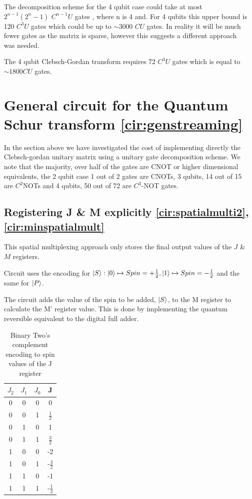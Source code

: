 \documentclass[12pt]{article}
\begin{document}
The decomposition scheme for the 4 qubit case could take at most $2^{n-1}(2^n-1)$ $C^{n-1}U$ gates \cite{li2013decomposition}, where n is 4 and. For 4 qubits this upper bound is 120 $C^3U$ gates which could be up to $\sim 3000$ $CU$ gates. In reality it will be much fewer gates as the matrix is sparse, however this suggests a different approach was needed.

The 4 qubit Clebsch-Gordan transform requires 72 $C^3U$ gates which is equal to $\sim 1800 CU$ gates. 

\section{General circuit for the Quantum Schur transform \autoref{cir:genstreaming}}

In the section above we have investigated the cost of implementing directly the Clebsch-gordan unitary matrix using a unitary gate decomposition scheme. We note that the majority, over half of the gates are CNOT or higher dimensional equivalents, the 2 qubit case 1 out of 2 gates are CNOTs, 3 qubits, 14 out of 15 are $C^2$NOTs and 4 qubits, 50 out of 72 are $C^3$-NOT gates. 


\subsection{Registering J \& M explicitly \autoref{cir:spatialmulti2}, \autoref{cir:minspatialmult}}

This spatial multiplexing approach only stores the final output values of the $J$ \& $M$ registers. 


Circuit uses the encoding for $\left\vert{S}\right\rangle : \left\vert{0}\right\rangle \mapsto Spin = +\frac{1}{2}, \left\vert{1}\right\rangle \mapsto Spin = -\frac{1}{2}$ and the same for $\left\vert{P}\right\rangle$. 

The circuit adds the value of the spin to be added, $\left\vert{S}\right\rangle$, to the M register to calculate the M' register value. This is done by implementing the quantum reversible equivalent to the digital full adder. 

\begin{table}
\begin{tabular}{ |c c c|c| }
\hline
 $J_2$ &$J_1$ &$J_0$ &J \\
 \hline
 0 &0 &0 &0 \\ 
 0 &0 &1 &$\frac{1}{2}$ \\ 
 0 &1 &0 &1 \\ 
 0 &1 &1 &$\frac{3}{2}$ \\ 
 \hline 
 1 &0 &0 &-2 \\ 
 1 &0 &1 &-$\frac{3}{2}$ \\ 
 1 &1 &0 &-1 \\ 
 1 &1 &1 &-$\frac{1}{2}$ \\  
 \hline 
\end{tabular}
\caption{Binary Two's complement encoding to spin values of the J register}
\label{tab:encoding}
\vspace{-110pt}
\end{table}
\end{document}
